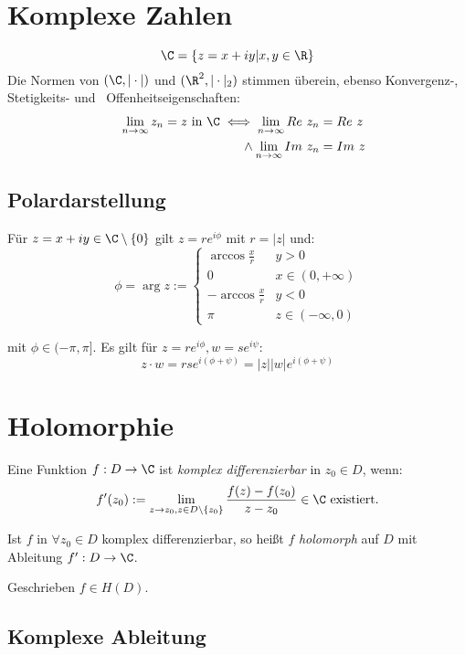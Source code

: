 \section*{Komplexe Zahlen}

\[\C = \{ z = x+iy | x,y \in \R \}\]
Die Normen von \((\C,|\cdot|)\) und \((\R^2,|\cdot|_2)\) stimmen überein, ebenso Konvergenz-, Stetigkeits- und \ Offenheitseigenschaften:
\begin{align*}
\lim_{n \to \infty} z_n = z \text{ in } \C \iff \lim_{n \to \infty} Re \ z_n &= Re \ z \\
\phantom{\lim_{n \to \infty} z_n = z \text{ in } \C \iff} \land \lim_{n \to \infty} Im \ z_n &= Im \ z
\end{align*}

\subsection*{Polardarstellung}

Für \(z = x +iy \in \C \setminus \{0\}\) gilt \(z = re^{i\phi}\) mit \(r = |z|\) und:
\[ \phi = \arg z := \begin{cases}
	\arccos \frac{x}{r} & y > 0 \\
	0 & x \in (0,+\infty) \\
	-\arccos \frac{x}{r} & y < 0 \\
	\pi & z \in (-\infty,0)
\end{cases} \]

mit \(\phi \in (-\pi, \pi]\). Es gilt für \(z = re^{i\phi}, w = se^{i\psi}\): \[z \cdot w = rse^{i(\phi+\psi)} = |z||w|e^{i(\phi+\psi)}\]

\section*{Holomorphie}

Eine Funktion \(f : D \to \C\) ist \emph{komplex differenzierbar} in \(z_0 \in D\), wenn:
\[ f'(z_0) := \displaystyle\lim_{z \to z_0, z \in D\setminus\{z_0\}} \frac{f(z)-f(z_0)}{z-z_0} \in \C \text{ existiert.} \]

Ist \(f\) in \(\forall z_0 \in D\) komplex differenzierbar, so heißt \(f\) \emph{holomorph} auf \(D\) mit Ableitung \(f' : D \to \C\).

Geschrieben \(f \in H(D)\).

\subsection*{Komplexe Ableitung}

